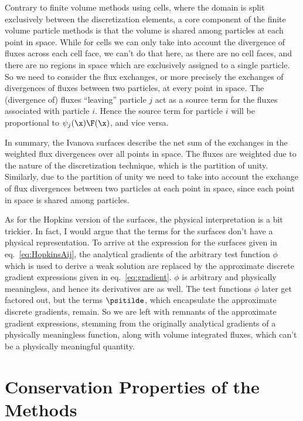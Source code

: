 Contrary to finite volume methods using cells, where the domain is split exclusively between the
discretization elements, a core component of the finite volume particle methods is that the volume
is shared among particles at each point in space. While for cells we can only take into account the
divergence of fluxes across each cell face, we can't do that here, as there are no cell faces, and
there are no regions in space which are exclusively assigned to a single particle. So we need to
consider the flux exchanges, or more precisely the exchanges of divergences of fluxes between two
particles, at every point in space. The (divergence of) fluxes ``leaving'' particle $j$ act as a
source term for the fluxes associated with particle $i$. Hence the source term for particle $i$
will
be proportional to $\psi_j(\x) \F(\x)$, and vice versa.


In summary, the Ivanova surfaces describe the net sum of the exchanges in the weighted flux
divergences over all points in space. The fluxes are weighted due to the nature of the
discretization technique, which is the partition of unity. Similarly, due to the partition of unity
we need to take into account the exchange of flux divergences between two particles at each point
in
space, since each point in space is shared among particles.


As for the Hopkins version of the surfaces, the physical interpretation is a bit trickier. In fact,
I would argue that the terms for the surfaces don't have a physical representation. To arrive at
the expression for the surfaces given in eq.~\ref{eq:HopkinsAij}, the analytical gradients of the
arbitrary test function $\phi$ which is used to derive a weak solution are replaced by the
approximate discrete gradient expressions given in eq.~\ref{eq:gradient}. $\phi$ is arbitrary and
physically meaningless, and hence its derivatives are as well. The test functions $\phi$ later get
factored out, but the terms $\psitilde$, which encapsulate the approximate discrete gradients,
remain. So we are left with remnants of the approximate gradient expressions, stemming from the
originally analytical gradients of a physically meaningless function, along with volume integrated
fluxes, which can't be a physically meaningful quantity.








\section{Conservation Properties of the Methods}\label{chap:meshless-conservation-properties}

